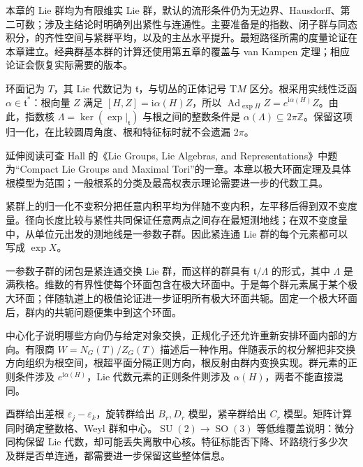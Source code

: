 \ProseParagraphBreak

本章的 Lie 群均为有限维实 Lie 群，默认的流形条件仍为无边界、Hausdorff、第二可数；涉及主结论时明确列出紧性与连通性。主要准备是的指数、闭子群与同态积分，的齐性空间与紧群平均，以及的主丛水平提升。最短路径所需的度量论证在本章建立。经典群基本群的计算还使用第五章的覆盖与 van Kampen 定理；相应论证会恢复实际需要的版本。

\ProseParagraphBreak

环面记为 \(T\)，其 Lie 代数记为 \(\mathfrak t\)，与切丛的正体记号 \(\mathrm{T}M\) 区分。根采用实线性泛函 \(\alpha\in\mathfrak t^*\)：根向量 \(Z\) 满足 \([H,Z]=\mathrm{i}\alpha(H)Z\)，所以 \(\operatorname{Ad}_{\exp H}Z=e^{\mathrm{i}\alpha(H)}Z\)。由此，指数核 \(\Lambda=\ker(\exp|_{\mathfrak t})\) 与根之间的整数条件是 \(\alpha(\Lambda)\subseteq2\pi\mathbb Z\)。保留这项归一化，在比较圆周角度、根和特征标时就不会遗漏 \(2\pi\)。

\ProseParagraphBreak

延伸阅读可查 Hall 的《Lie Groups, Lie Algebras, and Representations》中题为“Compact Lie Groups and Maximal Tori”的一章\cite{Hall2015}。本章以极大环面定理及具体根模型为范围；一般根系的分类及最高权表示理论需要进一步的代数工具。







\begin{chaptersummary}
	紧群上的归一化不变积分把任意内积平均为伴随不变内积，左平移后得到双不变度量。径向长度比较与紧性共同保证任意两点之间存在最短测地线；在双不变度量中，从单位元出发的测地线是一参数子群。因此紧连通 Lie 群的每个元素都可以写成 \(\exp X\)。

	\ProseParagraphBreak

	一参数子群的闭包是紧连通交换 Lie 群，而这样的群具有 \(\mathfrak t/\Lambda\) 的形式，其中 \(\Lambda\) 是满秩格。维数的有界性使每个环面包含在极大环面中。于是每个群元素属于某个极大环面；伴随轨道上的极值论证进一步证明所有极大环面共轭。固定一个极大环面后，群内的共轭问题便集中到这个环面。

	\ProseParagraphBreak

	中心化子说明哪些方向仍与给定对象交换，正规化子还允许重新安排环面内部的方向。有限商 \(W=N_G(T)/Z_G(T)\) 描述后一种作用。伴随表示的权分解把非交换方向组织为根空间，根超平面分隔正则方向，根反射由群内变换实现。群元素的正则条件涉及 \(e^{\mathrm{i}\alpha(H)}\)，Lie 代数元素的正则条件则涉及 \(\alpha(H)\)，两者不能直接混同。

	\ProseParagraphBreak

	酉群给出差根 \(\varepsilon_j-\varepsilon_k\)，旋转群给出 \(B_r,D_r\) 模型，紧辛群给出 \(C_r\) 模型。矩阵计算同时确定整数格、Weyl 群和中心。\(\operatorname{SU}(2)\to\operatorname{SO}(3)\) 等低维覆盖说明：微分同构保留 Lie 代数，却可能丢失离散中心核。特征标能否下降、环路绕行多少次及群是否单连通，都需要进一步保留这些整体信息。
\end{chaptersummary}

